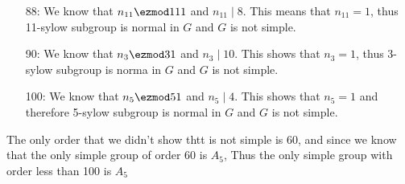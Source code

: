 \begin{enumerate}[label=]
\begin{itemize}
            \item[88:] We know that $n_{11} \ezmod 11 1$ and $n_{11} \mid 8$. This means that $n_{11} = 1$, thus 11-sylow subgroup is normal in $G$ and $G$ is not simple.
            
            \item[90:] We know that $n_3 \ezmod 3 1$ and $n_3 \mid 10$. This shows that $n_3 = 1$, thus 3-sylow subgroup is norma in $G$ and $G$ is not simple.

            \item[100:] We know that $n_5 \ezmod 5 1$ and $n_5 \mid 4$. This shows that $n_5 = 1$ and therefore 5-sylow subgroup is normal in $G$ and $G$ is not simple.
        \end{itemize}
        The only order that we didn't show thtt is not simple is 60, and since we know that the only simple group of order 60 is $A_5$, Thus the only simple group with order less than 100 is $A_5$
\end{enumerate}